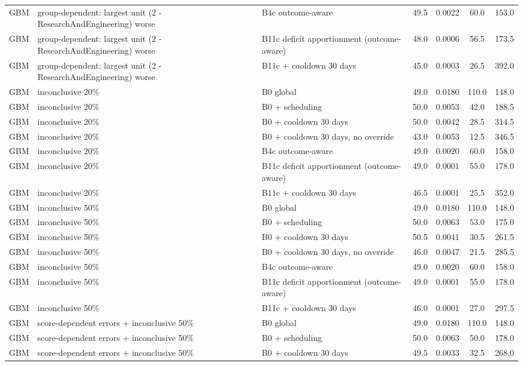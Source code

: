 \documentclass[10pt,onecolumn,letterpaper]{article}
\begin{document}
\begin{longtable}{lp{5.2cm}p{4.4cm}cccc}
GBM & group-dependent: largest unit (2 - ResearchAndEngineering) worse & B4c outcome-aware & 49.5 & 0.0022 & 60.0 & 153.0 \\
GBM & group-dependent: largest unit (2 - ResearchAndEngineering) worse & B11c deficit apportionment (outcome-aware) & 48.0 & 0.0006 & 56.5 & 173.5 \\
GBM & group-dependent: largest unit (2 - ResearchAndEngineering) worse & B11c + cooldown 30 days & 45.0 & 0.0003 & 26.5 & 392.0 \\
GBM & inconclusive 20\% & B0 global & 49.0 & 0.0180 & 110.0 & 148.0 \\
GBM & inconclusive 20\% & B0 + scheduling & 50.0 & 0.0053 & 42.0 & 188.5 \\
GBM & inconclusive 20\% & B0 + cooldown 30 days & 50.0 & 0.0042 & 28.5 & 314.5 \\
GBM & inconclusive 20\% & B0 + cooldown 30 days, no override & 43.0 & 0.0053 & 12.5 & 346.5 \\
GBM & inconclusive 20\% & B4c outcome-aware & 49.0 & 0.0020 & 60.0 & 158.0 \\
GBM & inconclusive 20\% & B11c deficit apportionment (outcome-aware) & 49.0 & 0.0001 & 55.0 & 178.0 \\
GBM & inconclusive 20\% & B11c + cooldown 30 days & 46.5 & 0.0001 & 25.5 & 352.0 \\
GBM & inconclusive 50\% & B0 global & 49.0 & 0.0180 & 110.0 & 148.0 \\
GBM & inconclusive 50\% & B0 + scheduling & 50.0 & 0.0063 & 53.0 & 175.0 \\
GBM & inconclusive 50\% & B0 + cooldown 30 days & 50.5 & 0.0041 & 30.5 & 261.5 \\
GBM & inconclusive 50\% & B0 + cooldown 30 days, no override & 46.0 & 0.0047 & 21.5 & 285.5 \\
GBM & inconclusive 50\% & B4c outcome-aware & 49.0 & 0.0020 & 60.0 & 158.0 \\
GBM & inconclusive 50\% & B11c deficit apportionment (outcome-aware) & 49.0 & 0.0001 & 55.0 & 178.0 \\
GBM & inconclusive 50\% & B11c + cooldown 30 days & 46.0 & 0.0001 & 27.0 & 297.5 \\
GBM & score-dependent errors + inconclusive 50\% & B0 global & 49.0 & 0.0180 & 110.0 & 148.0 \\
GBM & score-dependent errors + inconclusive 50\% & B0 + scheduling & 50.0 & 0.0063 & 50.0 & 178.0 \\
GBM & score-dependent errors + inconclusive 50\% & B0 + cooldown 30 days & 49.5 & 0.0033 & 32.5 & 268.0 \\

\end{longtable}
\end{document}
